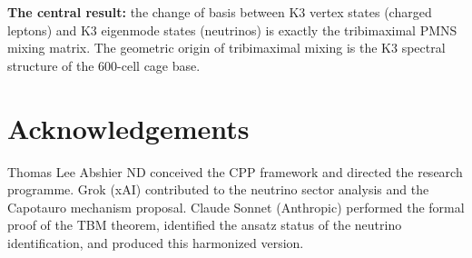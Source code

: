 \documentclass[11pt]{article}
\begin{document}
\bigskip
\noindent\textbf{The central result:} the change of basis between
K3 vertex states (charged leptons) and K3 eigenmode states (neutrinos)
is exactly the tribimaximal PMNS mixing matrix.  The geometric origin
of tribimaximal mixing is the K3 spectral structure of the 600-cell
cage base.

\section*{Acknowledgements}

Thomas Lee Abshier ND conceived the CPP framework and directed the
research programme.  Grok (xAI) contributed to the neutrino sector
analysis and the Capotauro mechanism proposal.  Claude Sonnet
(Anthropic) performed the formal proof of the TBM theorem,
identified the ansatz status of the neutrino identification, and
produced this harmonized version.
\end{document}
